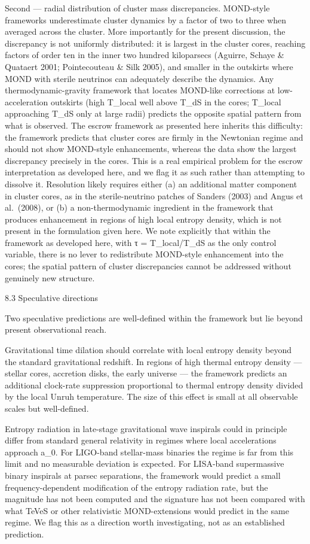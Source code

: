 \documentclass[11pt]{article}
\begin{document}
Second --- radial distribution of cluster mass discrepancies. MOND-style frameworks underestimate cluster dynamics by a factor of two to three when averaged across the cluster. More importantly for the present discussion, the discrepancy is not uniformly distributed: it is largest in the cluster cores, reaching factors of order ten in the inner two hundred kiloparsecs (Aguirre, Schaye \& Quataert 2001; Pointecouteau \& Silk 2005), and smaller in the outskirts where MOND with sterile neutrinos can adequately describe the dynamics. Any thermodynamic-gravity framework that locates MOND-like corrections at low-acceleration outskirts (high T\_local well above T\_dS in the cores; T\_local approaching T\_dS only at large radii) predicts the opposite spatial pattern from what is observed. The escrow framework as presented here inherits this difficulty: the framework predicts that cluster cores are firmly in the Newtonian regime and should not show MOND-style enhancements, whereas the data show the largest discrepancy precisely in the cores. This is a real empirical problem for the escrow interpretation as developed here, and we flag it as such rather than attempting to dissolve it. Resolution likely requires either (a) an additional matter component in cluster cores, as in the sterile-neutrino patches of Sanders (2003) and Angus et al.~(2008), or (b) a non-thermodynamic ingredient in the framework that produces enhancement in regions of high local entropy density, which is not present in the formulation given here. We note explicitly that within the framework as developed here, with τ = T\_local/T\_dS as the only control variable, there is no lever to redistribute MOND-style enhancement into the cores; the spatial pattern of cluster discrepancies cannot be addressed without genuinely new structure.

8.3 Speculative directions

Two speculative predictions are well-defined within the framework but lie beyond present observational reach.

Gravitational time dilation should correlate with local entropy density beyond the standard gravitational redshift. In regions of high thermal entropy density --- stellar cores, accretion disks, the early universe --- the framework predicts an additional clock-rate suppression proportional to thermal entropy density divided by the local Unruh temperature. The size of this effect is small at all observable scales but well-defined.

Entropy radiation in late-stage gravitational wave inspirals could in principle differ from standard general relativity in regimes where local accelerations approach a\_0. For LIGO-band stellar-mass binaries the regime is far from this limit and no measurable deviation is expected. For LISA-band supermassive binary inspirals at parsec separations, the framework would predict a small frequency-dependent modification of the entropy radiation rate, but the magnitude has not been computed and the signature has not been compared with what TeVeS or other relativistic MOND-extensions would predict in the same regime. We flag this as a direction worth investigating, not as an established prediction.
\end{document}
